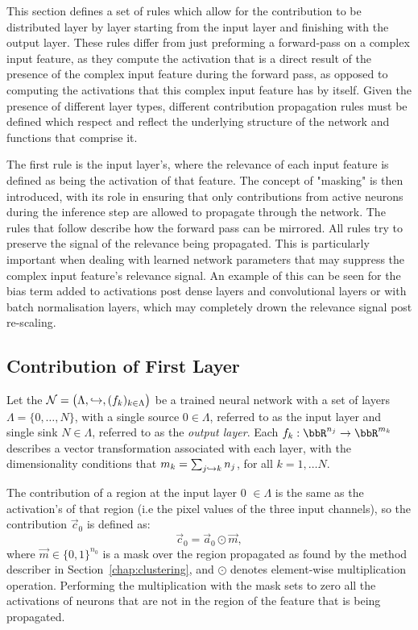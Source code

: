 This section defines a set of rules which allow for the contribution to be distributed layer by layer starting from the input layer and finishing with the output layer. These rules differ from just preforming a forward-pass on a complex input feature, as they compute the activation that is a direct result of the presence of the complex input feature during the forward pass, as opposed to computing the activations that this complex input feature has by itself. Given the presence of different layer types, different contribution propagation rules must be defined which respect and reflect the underlying structure of the network and functions that comprise it.

The first rule is the input layer's, where the relevance of each input feature is defined as being the activation of that feature. The concept of "masking" is then introduced, with its role in ensuring that only contributions from active neurons during the inference step are allowed to propagate through the network. The rules that follow describe how the forward pass can be mirrored. All rules try to preserve the signal of the relevance being propagated. This is particularly important when dealing with learned network parameters that may suppress the complex input feature's relevance signal. An example of this can be seen for the bias term added to activations post dense layers and convolutional layers or with batch normalisation layers, which may completely drown the relevance signal post re-scaling. 


\subsection{Contribution of First Layer}

Let the $\mathcal{N}=\big(\Lambda,\hookrightarrow,(f_k)_{k\in \Lambda}\big)$ be a trained neural network with a set of layers $\Lambda=\{0,\dots, N\}$, with a single source $0\in \Lambda$, referred to as the input layer and single sink $N\in \Lambda$, referred to as the \emph{output layer}. Each $f_k:\bbR^{n_j}\to \bbR^{m_k}$ describes a vector transformation associated with each layer, with the dimensionality conditions that $m_k=\sum_{j\hookrightarrow k} n_j$, for all $k=1,\dots N$.


The contribution of a region at the input layer 0 $\in \Lambda$ is the same as the activation's of that region (i.e the pixel values of the three input channels), so the contribution $\vec{c}_0$ is defined as:
\begin{equation*}
    \vec{c}_0 = \vec{a}_0 \odot \vec{m},
\end{equation*}
where $\vec{m}\in \{0,1\}^{n_0}$ is a mask over the region propagated as found by the method describer in Section~\ref{chap:clustering}, and $\odot$ denotes element-wise multiplication operation. Performing the multiplication with the mask sets to zero all the activations of neurons that are not in the region of the feature that is being propagated.

